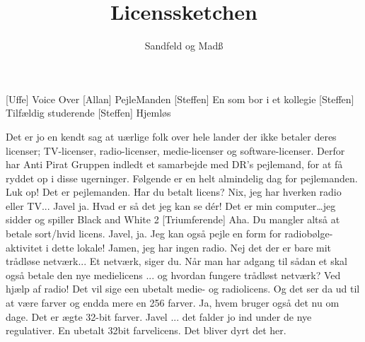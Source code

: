 \documentclass[a4paper,11pt]{article}
\title{Licenssketchen}
\author{Sandfeld og Madß}
\begin{document}
\maketitle

\begin{roles}
[Uffe] Voice Over
[Allan] PejleManden
[Steffen]  En som bor i et kollegie
[Steffen] Tilfældig studerende
[Steffen] Hjemløs
\end{roles}

\begin{props}
\end{props}

  
\begin{sketch}


 Det er jo en kendt sag at uærlige folk over hele lander der ikke betaler
          deres licenser; TV-licenser, radio-licenser, medie-licenser og 
          software-licenser. Derfor har Anti Pirat Gruppen indledt et samarbejde med
          DR's pejlemand, for at få ryddet op i disse ugerninger. Følgende er en helt
          almindelig dag for pejlemanden.
 
          Luk op! Det er pejlemanden.
   
 Har du betalt licens?
  Nix, jeg har hverken radio eller TV...
 Javel ja. Hvad er så det jeg kan se d\'er!
  Det er min computer\ldots jeg sidder og spiller Black and White 2
[Triumferende] Aha. Du mangler altså at betale sort/hvid licens.
          Javel, ja. Jeg kan også pejle en form for
          radiobølge-aktivitet i dette lokale!
  Jamen, jeg har ingen radio. Nej det der er bare mit trådløse
          netværk...
 Et netværk, siger du. Når man har adgang til sådan et skal
          også betale den nye medielicens ... og hvordan fungere
          trådløst netværk? Ved hjælp af radio! Det vil sige een
          ubetalt medie- og radiolicens.   Og
          det ser da ud til at være farver og endda mere en 256 farver.
  Ja, hvem bruger også det nu om dage. Det er ægte 32-bit
          farver.
 Javel ... det falder jo ind under de nye regulativer. En
          ubetalt 32bit farvelicens. Det bliver dyrt det her.


\end{sketch}
\end{document}
